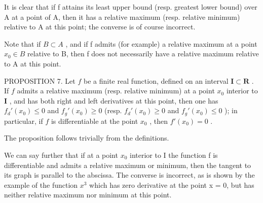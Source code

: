 It is clear that if f attains its least upper bound (resp. greatest lower bound) over A at a point of A, then it has a relative maximum (resp. relative minimum) relative to A at this point; the converse is of course incorrect.

Note that if \(B \subset A\) , and if f admits (for example) a relative maximum at a point \(x_{0} \in B\) relative to B, then f does not necessarily have a relative maximum relative to A at this point.

PROPOSITION 7. Let \(f\) be a finite real function, defined on an interval \(\mathbf{I} \subset \mathbf{R}\) . If \(f\) admits a relative maximum (resp. relative minimum) at a point \(x_0\) interior to \(\mathbf{I}\) , and has both right and left derivatives at this point, then one has \(f_d'(x_0) \leqslant 0\) and \(f_g'(x_0) \geqslant 0\) (resp. \(f_d'(x_0) \geqslant 0\) and \(f_g'(x_0) \leqslant 0\) ); in particular, if \(f\) is differentiable at the point \(x_0\) , then \(f'(x_0) = 0\) .

The proposition follows trivially from the definitions.

We can say further that if at a point \(x_{0}\) interior to I the function f is differentiable and admits a relative maximum or minimum, then the tangent to its graph is parallel to the abscissa. The converse is incorrect, as is shown by the example of the function \(x^{3}\) which has zero derivative at the point x = 0, but has neither relative maximum nor minimum at this point.

